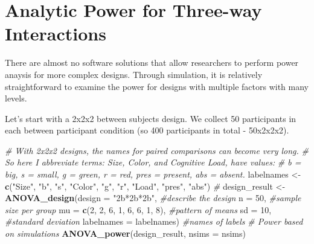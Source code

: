 \documentclass[]{book}
\newenvironment{Shaded}{\begin{snugshade}}{\end{snugshade}}
\newcommand{\CommentTok}[1]{\textcolor[rgb]{0.56,0.35,0.01}{\textit{#1}}}
\newcommand{\DataTypeTok}[1]{\textcolor[rgb]{0.13,0.29,0.53}{#1}}
\newcommand{\DecValTok}[1]{\textcolor[rgb]{0.00,0.00,0.81}{#1}}
\newcommand{\KeywordTok}[1]{\textcolor[rgb]{0.13,0.29,0.53}{\textbf{#1}}}
\newcommand{\NormalTok}[1]{#1}
\newcommand{\StringTok}[1]{\textcolor[rgb]{0.31,0.60,0.02}{#1}}
\begin{document}
\hypertarget{analytic-power-for-three-way-interactions}{%
\chapter{Analytic Power for Three-way Interactions}\label{analytic-power-for-three-way-interactions}}

There are almost no software solutions that allow researchers to perform power anaysis for more complex designs. Through simulation, it is relatively straightforward to examine the power for designs with multiple factors with many levels.

Let's start with a 2x2x2 between subjects design. We collect 50 participants in each between participant condition (so 400 participants in total - 50x2x2x2).

\begin{Shaded}
\begin{Highlighting}[]
\CommentTok{# With 2x2x2 designs, the names for paired comparisons can become very long. }
\CommentTok{# So here I abbreviate terms: Size, Color, and Cognitive Load, have values:}
\CommentTok{# b = big, s = small, g = green, r = red, pres = present, abs = absent.  }
\NormalTok{labelnames <-}\StringTok{ }\KeywordTok{c}\NormalTok{(}\StringTok{"Size"}\NormalTok{, }\StringTok{"b"}\NormalTok{, }\StringTok{"s"}\NormalTok{, }\StringTok{"Color"}\NormalTok{, }\StringTok{"g"}\NormalTok{, }\StringTok{"r"}\NormalTok{, }
                \StringTok{"Load"}\NormalTok{, }\StringTok{"pres"}\NormalTok{, }\StringTok{"abs"}\NormalTok{) }\CommentTok{#}
\NormalTok{design_result <-}\StringTok{ }\KeywordTok{ANOVA_design}\NormalTok{(}\DataTypeTok{design =} \StringTok{"2b*2b*2b"}\NormalTok{, }\CommentTok{#describe the design}
                              \DataTypeTok{n =} \DecValTok{50}\NormalTok{, }\CommentTok{#sample size per group }
                              \DataTypeTok{mu =} \KeywordTok{c}\NormalTok{(}\DecValTok{2}\NormalTok{, }\DecValTok{2}\NormalTok{, }\DecValTok{6}\NormalTok{, }\DecValTok{1}\NormalTok{, }\DecValTok{6}\NormalTok{, }\DecValTok{6}\NormalTok{, }\DecValTok{1}\NormalTok{, }\DecValTok{8}\NormalTok{), }\CommentTok{#pattern of means}
                              \DataTypeTok{sd =} \DecValTok{10}\NormalTok{, }\CommentTok{#standard deviation}
                              \DataTypeTok{labelnames =}\NormalTok{ labelnames) }\CommentTok{#names of labels}
\CommentTok{# Power based on simulations}
\KeywordTok{ANOVA_power}\NormalTok{(design_result, }\DataTypeTok{nsims =}\NormalTok{ nsims)}
\end{Highlighting}
\end{Shaded}
\end{document}
